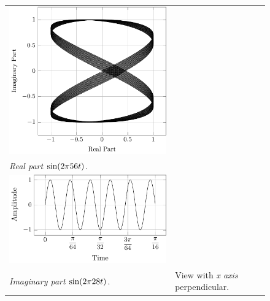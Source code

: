 \documentclass[../../course]{subfiles}
\begin{document}
\begin{figure} [H]
\begin{NiceTabularX} {\textwidth} {
            *{2}{>{\centering\arraybackslash}X}
        }
         {
             {
                \includegraphics[height = \textheight] {tikzpics/plotFrontViewComplexG.pdf}
            }
        }

        \\

         {\emph{Real part} $\sin(2 \pi 56 t)$.}
        \label{plt:realCmplxG}

        &
        \\

         {
             {
                \includegraphics[height = \textheight] {tikzpics/plotShortX1.pdf}
            }
        }

        &
        \\

         {\emph{Imaginary part} $\sin(2 \pi 28 t)$.}
        \label{plt:imagCmplxG}

        &

         {View with \emph{x axis} perpendicular.}
        \label{plt:frontViewCmplxG}

        \\

    \end{NiceTabularX}

\end{figure}
\end{document}
